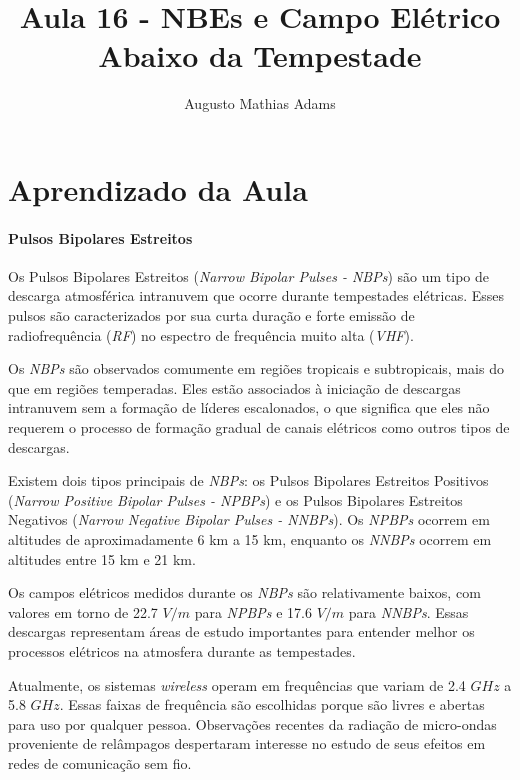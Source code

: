 \documentclass[a4paper, 12pt, onecolumn,singlespacing]{article}
\title{Aula 16 - NBEs e Campo Elétrico Abaixo da Tempestade}
\author[1]{Augusto Mathias Adams}
\affil[1]{augusto.adams@ufpr.br}
\begin{document}
	
	\maketitle
	
	\section{Aprendizado da Aula}
	
	\paragraph{Pulsos Bipolares Estreitos} Os Pulsos Bipolares Estreitos (\textit{Narrow Bipolar Pulses - NBPs}) são um tipo de descarga atmosférica intranuvem que ocorre durante tempestades elétricas. Esses pulsos são caracterizados por sua curta duração e forte emissão de radiofrequência (\textit{RF}) no espectro de frequência muito alta (\textit{VHF}).
	
	Os \textit{NBPs} são observados comumente em regiões tropicais e subtropicais, mais do que em regiões temperadas. Eles estão associados à iniciação de descargas intranuvem sem a formação de líderes escalonados, o que significa que eles não requerem o processo de formação gradual de canais elétricos como outros tipos de descargas.
	
	Existem dois tipos principais de \textit{NBPs}: os Pulsos Bipolares Estreitos Positivos (\textit{Narrow Positive Bipolar Pulses - NPBPs}) e os Pulsos Bipolares Estreitos Negativos (\textit{Narrow Negative Bipolar Pulses - NNBPs}). Os \textit{NPBPs} ocorrem em altitudes de aproximadamente 6 km a 15 km, enquanto os \textit{NNBPs} ocorrem em altitudes entre 15 km e 21 km.
	
	Os campos elétricos medidos durante os \textit{NBPs} são relativamente baixos, com valores em torno de 22.7 $V/m$ para \textit{NPBPs} e 17.6 $V/m$ para \textit{NNBPs}. Essas descargas representam áreas de estudo importantes para entender melhor os processos elétricos na atmosfera durante as tempestades.
	
	Atualmente, os sistemas \textit{wireless} operam em frequências que variam de 2.4 $GHz$ a 5.8 $GHz$. Essas faixas de frequência são escolhidas porque são livres e abertas para uso por qualquer pessoa. Observações recentes da radiação de micro-ondas proveniente de relâmpagos despertaram interesse no estudo de seus efeitos em redes de comunicação sem fio.
	
\end{document}

